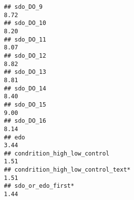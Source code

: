 \documentclass[
]{article}
\begin{document}
\begin{verbatim}
## sdo_DO_9                                                                                                                                                                                                                      8.72
## sdo_DO_10                                                                                                                                                                                                                     8.20
## sdo_DO_11                                                                                                                                                                                                                     8.07
## sdo_DO_12                                                                                                                                                                                                                     8.82
## sdo_DO_13                                                                                                                                                                                                                     8.81
## sdo_DO_14                                                                                                                                                                                                                     8.40
## sdo_DO_15                                                                                                                                                                                                                     9.00
## sdo_DO_16                                                                                                                                                                                                                     8.14
## edo                                                                                                                                                                                                                           3.44
## condrition_high_low_control                                                                                                                                                                                                   1.51
## condrition_high_low_control_text*                                                                                                                                                                                             1.51
## sdo_or_edo_first*                                                                                                                                                                                                             1.44

\end{verbatim}
\end{document}

